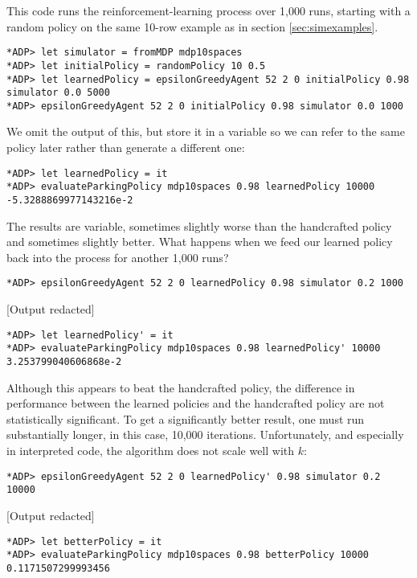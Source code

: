 \documentclass[paper=letter,pagesize=automedia,twoside=false,12pt]{scrartcl}
\theoremstyle{plain}%
\theoremstyle{definition}
\theoremstyle{remark}
\begin{document}
This code runs the reinforcement-learning process over 1,000 runs, starting with a random policy on the same 10-row example as in section \ref{sec:simexamples}.

\begin{verbatim}
*ADP> let simulator = fromMDP mdp10spaces
*ADP> let initialPolicy = randomPolicy 10 0.5
*ADP> let learnedPolicy = epsilonGreedyAgent 52 2 0 initialPolicy 0.98 simulator 0.0 5000
*ADP> epsilonGreedyAgent 52 2 0 initialPolicy 0.98 simulator 0.0 1000
\end{verbatim}

We omit the output of this, but store it in a variable so we can refer to the same policy later rather than generate a different one:

\begin{verbatim}
*ADP> let learnedPolicy = it
*ADP> evaluateParkingPolicy mdp10spaces 0.98 learnedPolicy 10000
-5.3288869977143216e-2
\end{verbatim}

The results are variable, sometimes slightly worse than the handcrafted policy and sometimes slightly better.  What happens when we feed our learned policy back into the process for another 1,000 runs?

\begin{verbatim}
*ADP> epsilonGreedyAgent 52 2 0 learnedPolicy 0.98 simulator 0.2 1000
\end{verbatim}
[Output redacted]
\begin{verbatim}
*ADP> let learnedPolicy' = it
*ADP> evaluateParkingPolicy mdp10spaces 0.98 learnedPolicy' 10000
3.253799040606868e-2
\end{verbatim}

Although this appears to beat the handcrafted policy, the difference in performance between the learned policies and the handcrafted policy are not statistically significant.  To get a significantly better result, one must run substantially longer, in this case, 10,000 iterations.  Unfortunately, and especially in interpreted code, the algorithm does not scale well with \(k\):

\begin{verbatim}
*ADP> epsilonGreedyAgent 52 2 0 learnedPolicy' 0.98 simulator 0.2 10000
\end{verbatim}
[Output redacted]
\begin{verbatim}
*ADP> let betterPolicy = it
*ADP> evaluateParkingPolicy mdp10spaces 0.98 betterPolicy 10000
0.1171507299993456
\end{verbatim}
\end{document}
